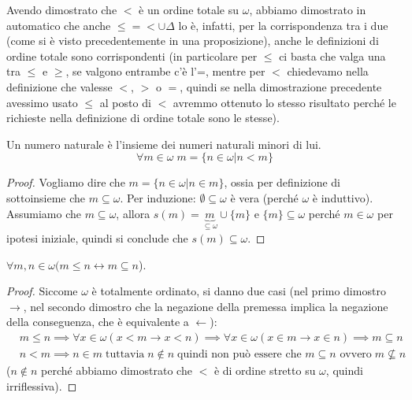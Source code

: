 \documentclass[11pt]{scrartcl}
\begin{document}
\begin{remark}
	Avendo dimostrato che $<$ è un ordine totale su $\omega$, abbiamo dimostrato in automatico che anche $\leq = < \cup \Delta$ lo è, infatti, per la corrispondenza tra i due (come si è visto precedentemente in una proposizione), anche le definizioni di ordine totale sono corrispondenti (in particolare per 
	$\leq$ ci basta che valga una tra $\leq$ e $\geq$, se valgono entrambe c'è l'=, mentre per $<$ chiedevamo nella definizione che valesse $<$, $>$ o $=$, quindi se nella dimostrazione precedente avessimo usato $\leq$ al posto di $<$ avremmo ottenuto lo stesso risultato perché le richieste nella definizione di ordine totale sono le stesse).
\end{remark}

\begin{corollary}
	Un numero naturale è l'insieme dei numeri naturali minori di lui.
	\[ \forall m \in \omega \; m = \{n \in \omega | n < m\}
		\]
\end{corollary}

\begin{proof}
	Vogliamo dire che $m = \{ n \in \omega | n \in m\}$, ossia per definizione di sottoinsieme che $m \subseteq \omega$. Per induzione: $\emptyset \subseteq \omega$ è vera (perché $\omega$ è induttivo).
	Assumiamo che $m \subseteq \omega$, allora $s(m) = \underbrace{m}_{\subseteq \omega} \cup \{m\}$ e $\{m\} \subseteq \omega$ perché $m \in \omega$ per ipotesi iniziale, quindi si conclude che $s(m) \subseteq \omega$.
\end{proof}

\begin{corollary}[Più piccolo = contenuto]
	$\forall m,n \in \omega (m \leq n \leftrightarrow m \subseteq n$).
\end{corollary}

\begin{proof}
	Siccome $\omega$ è totalmente ordinato, si danno due casi (nel primo dimostro $\rightarrow$, nel secondo dimostro che la negazione della premessa implica la negazione della conseguenza, che è equivalente a $\leftarrow$):
	\[  \begin{split}
		& m \leq n \implies \forall x \in \omega (x < m \rightarrow x < n) \implies \forall x \in \omega (x \in m \rightarrow x \in n) \implies m \subseteq n \\
	    & n < m \implies n \in m \; \text{tuttavia} \; n \not\in n \; \text{quindi non può essere che $m \subseteq n$ ovvero} \; m \not\subseteq n
		\end{split}
			\]
	($n \not \in n$ perché abbiamo dimostrato che $<$ è di ordine stretto su $\omega$, quindi irriflessiva).
\end{proof}
\end{document}
